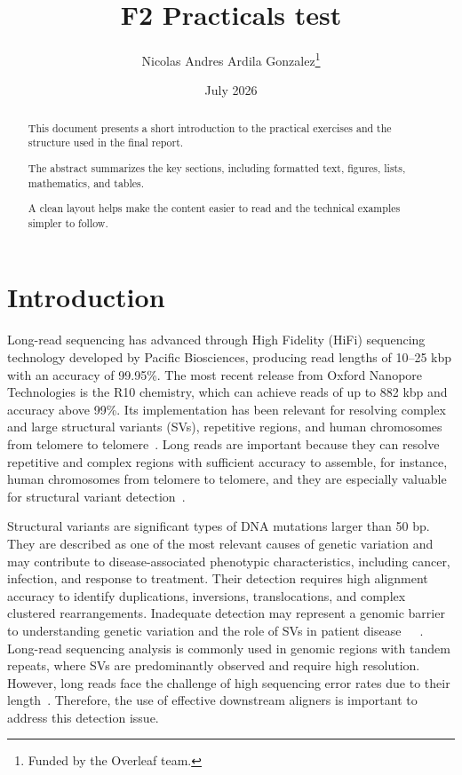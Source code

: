 \documentclass[12pt, letterpaper]{article}
\title{\textbf{F2 Practicals test}}
\author{Nicolas Andres Ardila Gonzalez\thanks{Funded by the Overleaf team.}}
\date{July 2026}
\begin{document}
\maketitle

\newpage

\begin{abstract}
This document presents a short introduction to the practical exercises and the structure used in the final report.

The abstract summarizes the key sections, including formatted text, figures, lists, mathematics, and tables.

A clean layout helps make the content easier to read and the technical examples simpler to follow.
\end{abstract}

\newpage
\tableofcontents

\newpage

\section{Introduction}

Long-read sequencing has advanced through High Fidelity (HiFi) sequencing technology developed by Pacific Biosciences, producing read lengths of 10--25 kbp with an accuracy of 99.95\%. The most recent release from Oxford Nanopore Technologies is the R10 chemistry, which can achieve reads of up to 882 kbp and accuracy above 99\%. Its implementation has been relevant for resolving complex and large structural variants (SVs), repetitive regions, and human chromosomes from telomere to telomere~\cite{Chang2025}. Long reads are important because they can resolve repetitive and complex regions with sufficient accuracy to assemble, for instance, human chromosomes from telomere to telomere, and they are especially valuable for structural variant detection~\cite{Rausch2025}.

Structural variants are significant types of DNA mutations larger than 50 bp. They are described as one of the most relevant causes of genetic variation and may contribute to disease-associated phenotypic characteristics, including cancer, infection, and response to treatment. Their detection requires high alignment accuracy to identify duplications, inversions, translocations, and complex clustered rearrangements. Inadequate detection may represent a genomic barrier to understanding genetic variation and the role of SVs in patient disease~\cite{Helal2024}~\cite{vacmap2025}~\cite{Sirén2025}. Long-read sequencing analysis is commonly used in genomic regions with tandem repeats, where SVs are predominantly observed and require high resolution. However, long reads face the challenge of high sequencing error rates due to their length~\cite{vacmap2025}. Therefore, the use of effective downstream aligners is important to address this detection issue.
\end{document}
